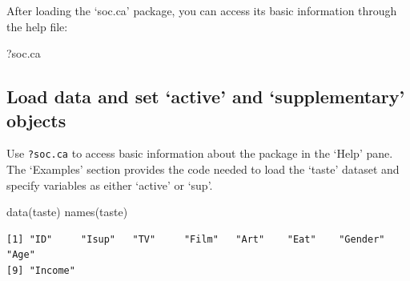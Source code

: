 \documentclass[
  letterpaper,
  DIV=11,
  numbers=noendperiod]{scrartcl}
\newenvironment{Shaded}{\begin{snugshade}}{\end{snugshade}}
\newcommand{\CommentTok}[1]{\textcolor[rgb]{0.37,0.37,0.37}{#1}}
\newcommand{\FunctionTok}[1]{\textcolor[rgb]{0.28,0.35,0.67}{#1}}
\newcommand{\NormalTok}[1]{\textcolor[rgb]{0.00,0.23,0.31}{#1}}
\newcommand{\OtherTok}[1]{\textcolor[rgb]{0.00,0.23,0.31}{#1}}
\newcommand{\SpecialCharTok}[1]{\textcolor[rgb]{0.37,0.37,0.37}{#1}}
\newcommand{\StringTok}[1]{\textcolor[rgb]{0.13,0.47,0.30}{#1}}
\begin{document}
After loading the `soc.ca' package, you can access its basic information
through the help file:

\scriptsize

\begin{Shaded}
\begin{Highlighting}[]
\NormalTok{?soc.ca}
\end{Highlighting}
\end{Shaded}

\normalsize

\subsection{Load data and set `active' and `supplementary'
objects}\label{load-data-and-set-active-and-supplementary-objects}

Use \texttt{?soc.ca} to access basic information about the package in
the `Help' pane. The `Examples' section provides the code needed to load
the `taste' dataset and specify variables as either `active' or `sup'.

\scriptsize

\begin{Shaded}
\begin{Highlighting}[]
\FunctionTok{data}\NormalTok{(taste)}
\FunctionTok{names}\NormalTok{(taste)}
\end{Highlighting}
\end{Shaded}

\begin{verbatim}
[1] "ID"     "Isup"   "TV"     "Film"   "Art"    "Eat"    "Gender" "Age"   
[9] "Income"
\end{verbatim}

\begin{Shaded}
\end{Shaded}
\end{document}
